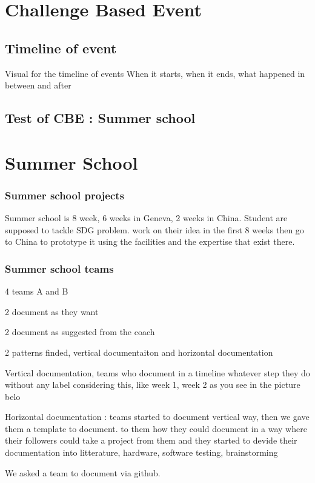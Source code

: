 \chapter{Challenge Based Event}

\section{Timeline of event}
Visual for the timeline of events
When it starts, when it ends, what happened in between and after

\section{Test of CBE : Summer school}
\chapter{Summer School}

\subsection{Summer school projects}
\label{sec:scprojects}
Summer school is 8 week, 6 weeks in Geneva, 2 weeks in China.
Student are supposed to tackle SDG problem.
work on their idea in the first 8 weeks then go to China to prototype it using the facilities and the expertise that exist there.


\subsection{Summer school teams}
\label{sec:scteams}
4 teams A and B

2 document as they want

2 document as suggested from the coach

2 patterns finded, vertical documentaiton  and horizontal documentation


Vertical documentation, teams who document in a timeline whatever step they do without any label considering this, like week 1, week 2 as you see in the picture belo

Horizontal documentation : teams started to document vertical way, then we gave them a template to document.
to them how they could document in a way where their followers could take a project from them and they started to devide their documentation into litterature, hardware, software testing, brainstorming

We asked a team to document via github.





